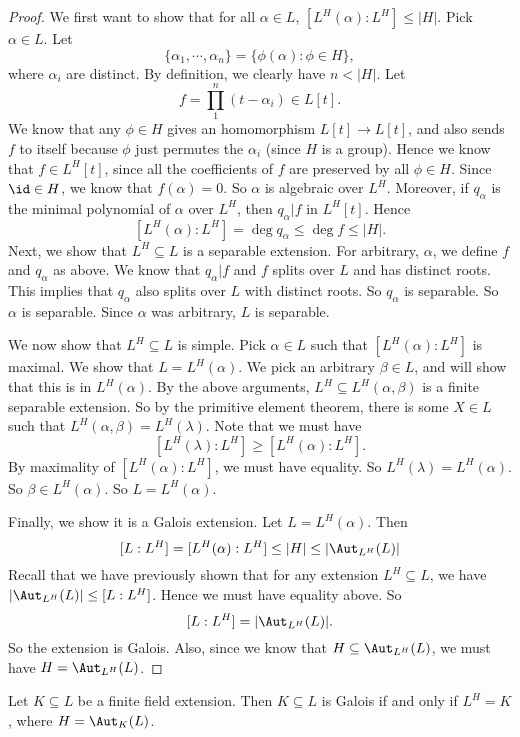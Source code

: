 \documentclass[a4paper]{article}
\begin{document}
\begin{proof}
  We first want to show that for all $\alpha \in L$, $[L^H(\alpha): L^H] \leq |H|$. Pick $\alpha \in L$. Let
  \[
    \{\alpha_1,\cdots, \alpha_n\} = \{\phi(\alpha): \phi \in H\},
  \]
  where $\alpha_i$ are distinct. By definition, we clearly have $n < |H|$. Let
  \[
    f = \prod_1^n (t - \alpha_i) \in L[t].
  \]
  We know that any $\phi \in H$ gives an homomorphism $L[t] \to L[t]$, and also sends $f$ to itself because $\phi$ just permutes the $\alpha_i$ (since $H$ is a group). Hence we know that $f \in L^H[t]$, since all the coefficients of $f$ are preserved by all $\phi \in H$. Since $\id \in H$, we know that $f(\alpha) = 0$. So $\alpha$ is algebraic over $L^H$. Moreover, if $q_\alpha$ is the minimal polynomial of $\alpha$ over $L^H$, then $q_\alpha | f$ in $L^H[t]$. Hence
  \[
    [L^H(\alpha): L^H] = \deg q_\alpha \leq \deg f \leq |H|.
  \]
  Next, we show that $L^H\subseteq L$ is a separable extension. For arbitrary, $\alpha$, we define $f$ and $q_\alpha$ as above. We know that $q_\alpha |f$ and $f$ splits over $L$ and has distinct roots. This implies that $q_\alpha$ also splits over $L$ with distinct roots. So $q_\alpha$ is separable. So $\alpha$ is separable. Since $\alpha$ was arbitrary, $L$ is separable.

  We now show that $L^H\subseteq L$ is simple. Pick $\alpha \in L$ such that $[L^H(\alpha): L^H]$ is maximal. We show that $L = L^H(\alpha)$. We pick an arbitrary $\beta \in L$, and will show that this is in $L^H(\alpha)$. By the above arguments, $L^H\subseteq L^H(\alpha, \beta)$ is a finite separable extension. So by the primitive element theorem, there is some $X \in L$ such that $L^H(\alpha, \beta) = L^H(\lambda)$. Note that we must have
  \[
    [L^H(\lambda): L^H] \geq [L^H(\alpha): L^H].
  \]
  By maximality of $[L^H(\alpha): L^H]$, we must have equality. So $L^H(\lambda) = L^H(\alpha)$. So $\beta \in L^H(\alpha)$. So $L = L^H(\alpha)$.

  Finally, we show it is a Galois extension. Let $L = L^H(\alpha)$. Then
  \[
    [L:L^H] = [L^H(\alpha): L^H] \leq |H| \leq |\Aut_{L^H}(L)|
  \]
  Recall that we have previously shown that for any extension $L^H\subseteq L$, we have $|\Aut_{L^H}(L)| \leq [L:L^H]$. Hence we must have equality above. So
  \[
    [L:L^H] = |\Aut_{L^H}(L)|.
  \]
  So the extension is Galois. Also, since we know that $H\subseteq \Aut_{L^H}(L)$, we must have $H = \Aut_{L^H}(L)$.
\end{proof}

\begin{thm}[]
  Let $K\subseteq L$ be a finite field extension. Then $K\subseteq L$ is Galois if and only if $L^H = K$, where $H = \Aut_K(L)$.
\end{thm}
\end{document}
